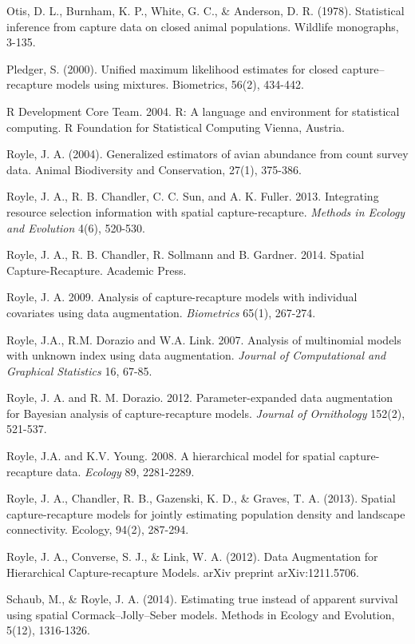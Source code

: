 \documentclass{book}
\begin{document}
\rf Otis, D. L., Burnham, K. P., White, G. C., \& Anderson,
D. R. (1978). Statistical inference from capture data on closed animal
populations. Wildlife monographs, 3-135.

\rf 
Pledger, S. (2000). Unified maximum likelihood estimates for closed
capture–recapture models using mixtures. Biometrics, 56(2), 434-442.

\rf R Development Core Team. 2004.
R: A language and environment for statistical computing.
R Foundation for Statistical Computing Vienna, Austria.


\rf Royle, J. A. (2004). Generalized estimators of avian abundance from count survey data. Animal Biodiversity and Conservation, 27(1), 375-386.



\rf Royle, J. A., R. B. Chandler, C. C. Sun, and
A. K. Fuller. 2013. Integrating resource selection information with
spatial capture-recapture. {\it Methods in Ecology and Evolution} 4(6), 520-530. 

\rf Royle, J. A., R. B. Chandler, R. Sollmann and B. 
Gardner. 2014. 
 Spatial Capture-Recapture. Academic Press.

\rf Royle, J. A. 2009. Analysis of capture-recapture models with
individual covariates using data augmentation. {\it Biometrics} 
  65(1), 267-274.

\rf Royle, J.A., R.M. Dorazio and W.A. Link. 2007. Analysis of multinomial 
models with unknown index using data augmentation. 
{\it Journal of Computational and Graphical Statistics}  16, 67-85.

\rf Royle, J. A. and R. M. Dorazio. 2012. Parameter-expanded data
augmentation for Bayesian analysis of capture-recapture
models. {\it Journal of Ornithology} 152(2), 521-537.

\rf  Royle, J.A. and K.V. Young. 2008. 
A hierarchical model for spatial capture-recapture data.
{\it Ecology}  89, 2281-2289.

\rf Royle, J. A., Chandler, R. B., Gazenski, K. D., \& Graves,
T. A. (2013). Spatial capture-recapture models for jointly estimating
population density and landscape connectivity. Ecology, 94(2),
287-294.

\rf Royle, J. A., Converse, S. J., \& Link, W. A. (2012). Data Augmentation
for Hierarchical Capture-recapture Models. arXiv preprint
arXiv:1211.5706.


\rf Schaub, M., \& Royle, J. A. (2014). Estimating true instead of apparent
survival using spatial Cormack–Jolly–Seber models. Methods in Ecology
and Evolution, 5(12), 1316-1326.
\end{document}
